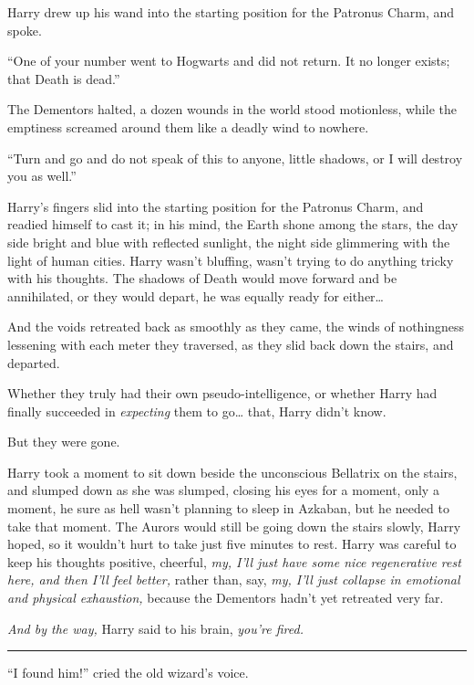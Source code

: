 Harry drew up his wand into the starting position for the Patronus
Charm, and spoke.

``One of your number went to Hogwarts and did not return. It no longer
exists; that Death is dead.''

The Dementors halted, a dozen wounds in the world stood motionless,
while the emptiness screamed around them like a deadly wind to nowhere.

``Turn and go and do not speak of this to anyone, little shadows, or I
will destroy you as well.''

Harry's fingers slid into the starting position for the Patronus Charm,
and readied himself to cast it; in his mind, the Earth shone among the
stars, the day side bright and blue with reflected sunlight, the night
side glimmering with the light of human cities. Harry wasn't bluffing,
wasn't trying to do anything tricky with his thoughts. The shadows of
Death would move forward and be annihilated, or they would depart, he
was equally ready for either\ldots{}

And the voids retreated back as smoothly as they came, the winds of
nothingness lessening with each meter they traversed, as they slid back
down the stairs, and departed.

Whether they truly had their own pseudo-intelligence, or whether Harry
had finally succeeded in \emph{expecting} them to go\ldots{} that, Harry
didn't know.

But they were gone.

Harry took a moment to sit down beside the unconscious Bellatrix on the
stairs, and slumped down as she was slumped, closing his eyes for a
moment, only a moment, he sure as hell wasn't planning to sleep in
Azkaban, but he needed to take that moment. The Aurors would still be
going down the stairs slowly, Harry hoped, so it wouldn't hurt to take
just five minutes to rest. Harry was careful to keep his thoughts
positive, cheerful, \emph{my, I'll just have some nice regenerative rest
here, and then I'll feel better,} rather than, say, \emph{my, I'll just
collapse in emotional and physical exhaustion,} because the Dementors
hadn't yet retreated very far.

\emph{And by the way,} Harry said to his brain, \emph{you're fired.}

\begin{center}\rule{3in}{0.4pt}\end{center}

``I found him!'' cried the old wizard's voice.

